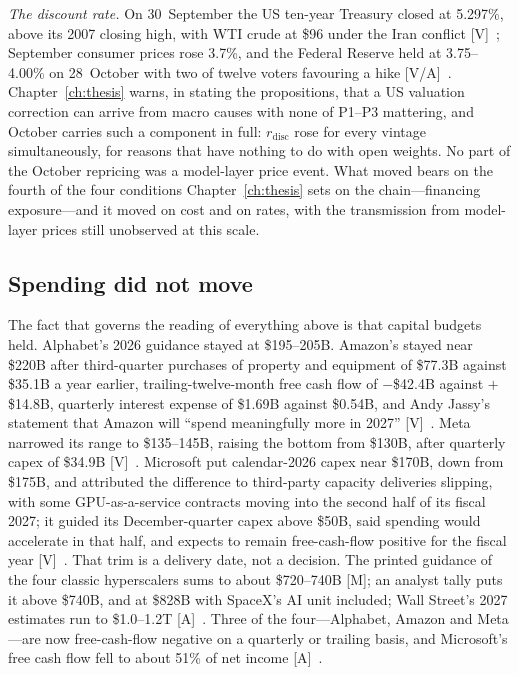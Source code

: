 \emph{The discount rate.} On 30~September the US ten-year Treasury closed at 5.297\%, above its 2007 closing high, with WTI crude at \$96 under the Iran conflict [V]~\cite{cap-treasury-sep}; September consumer prices rose 3.7\%, and the Federal Reserve held at 3.75--4.00\% on 28~October with two of twelve voters favouring a hike [V/A]~\cite{cap-nasdaq-oct}. Chapter~\ref{ch:thesis} warns, in stating the propositions, that a US valuation correction can arrive from macro causes with none of P1--P3 mattering, and October carries such a component in full: $r_{\mathrm{disc}}$ rose for every vintage simultaneously, for reasons that have nothing to do with open weights. No part of the October repricing was a model-layer price event. What moved bears on the fourth of the four conditions Chapter~\ref{ch:thesis} sets on the chain---financing exposure---and it moved on cost and on rates, with the transmission from model-layer prices still unobserved at this scale.

\subsection{Spending did not move}
\label{sec:cap-oct-capex}

The fact that governs the reading of everything above is that capital budgets held. Alphabet's 2026 guidance stayed at \$195--205B. Amazon's stayed near \$220B after third-quarter purchases of property and equipment of \$77.3B against \$35.1B a year earlier, trailing-twelve-month free cash flow of $-$\$42.4B against $+$\$14.8B, quarterly interest expense of \$1.69B against \$0.54B, and Andy Jassy's statement that Amazon will ``spend meaningfully more in 2027'' [V]~\cite{cap-amazon-q3}. Meta narrowed its range to \$135--145B, raising the bottom from \$130B, after quarterly capex of \$34.9B [V]~\cite{cap-meta-q3}. Microsoft put calendar-2026 capex near \$170B, down from \$175B, and attributed the difference to third-party capacity deliveries slipping, with some GPU-as-a-service contracts moving into the second half of its fiscal 2027; it guided its December-quarter capex above \$50B, said spending would accelerate in that half, and expects to remain free-cash-flow positive for the fiscal year [V]~\cite{cap-msft-fq1}. That trim is a delivery date, not a decision. The printed guidance of the four classic hyperscalers sums to about \$720--740B [M]; an analyst tally puts it above \$740B, and at \$828B with SpaceX's AI unit included; Wall Street's 2027 estimates run to \$1.0--1.2T [A]~\cite{cap-capex-tally}. Three of the four---Alphabet, Amazon and Meta---are now free-cash-flow negative on a quarterly or trailing basis, and Microsoft's free cash flow fell to about 51\% of net income [A]~\cite{cap-capex-tally,cap-msft-fq1}.

